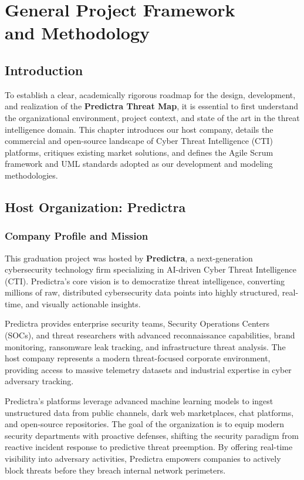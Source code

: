 \chapter[General Project Framework and Methodology]{General Project Framework \\ and Methodology}

\section{Introduction}
To establish a clear, academically rigorous roadmap for the design, development, and realization of the \textbf{Predictra Threat Map}, it is essential to first understand the organizational environment, project context, and state of the art in the threat intelligence domain. This chapter introduces our host company, details the commercial and open-source landscape of Cyber Threat Intelligence (CTI) platforms, critiques existing market solutions, and defines the Agile Scrum framework and UML standards adopted as our development and modeling methodologies.

\section{Host Organization: Predictra}

\subsection{Company Profile and Mission}
This graduation project was hosted by \textbf{Predictra}, a next-generation cybersecurity technology firm specializing in AI-driven Cyber Threat Intelligence (CTI). Predictra's core vision is to democratize threat intelligence, converting millions of raw, distributed cybersecurity data points into highly structured, real-time, and visually actionable insights. 

Predictra provides enterprise security teams, Security Operations Centers (SOCs), and threat researchers with advanced reconnaissance capabilities, brand monitoring, ransomware leak tracking, and infrastructure threat analysis. The host company represents a modern threat-focused corporate environment, providing access to massive telemetry datasets and industrial expertise in cyber adversary tracking.

Predictra's platforms leverage advanced machine learning models to ingest unstructured data from public channels, dark web marketplaces, chat platforms, and open-source repositories. The goal of the organization is to equip modern security departments with proactive defenses, shifting the security paradigm from reactive incident response to predictive threat preemption. By offering real-time visibility into adversary activities, Predictra empowers companies to actively block threats before they breach internal network perimeters.

